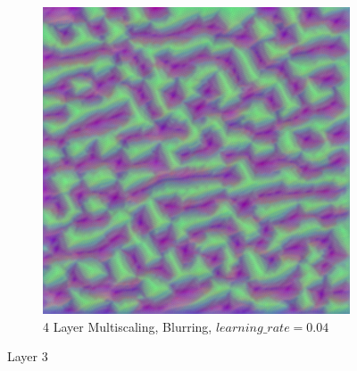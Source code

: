 \begin{figure}
\begin{subfigure}[t]{0.31\textwidth}
    \end{subfigure}
    \hfill
    \begin{subfigure}[t]{0.31\textwidth}
        \captionsetup{justification=centering}
        \centering
        \includegraphics[width=.7\linewidth]{figuras/feat_vis/experiments/initial/l3/random_image_pl4_lr4e-2_layer5.png}
        \caption{4 Layer Multiscaling, Blurring, \(learning\_rate = 0.04\)}
    \end{subfigure}

    \caption{Layer 3}
    \label{fig:layer_3}
\end{figure}

